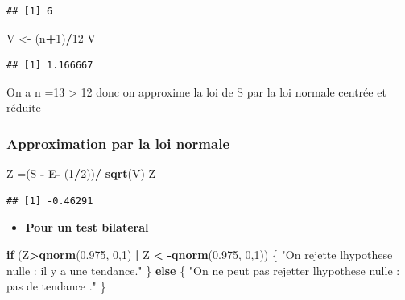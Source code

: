 \documentclass[
  12pt,
]{article}
\newenvironment{Shaded}{\begin{snugshade}}{\end{snugshade}}
\newcommand{\ControlFlowTok}[1]{\textcolor[rgb]{0.13,0.29,0.53}{\textbf{#1}}}
\newcommand{\DecValTok}[1]{\textcolor[rgb]{0.00,0.00,0.81}{#1}}
\newcommand{\FloatTok}[1]{\textcolor[rgb]{0.00,0.00,0.81}{#1}}
\newcommand{\FunctionTok}[1]{\textcolor[rgb]{0.13,0.29,0.53}{\textbf{#1}}}
\newcommand{\NormalTok}[1]{#1}
\newcommand{\OtherTok}[1]{\textcolor[rgb]{0.56,0.35,0.01}{#1}}
\newcommand{\SpecialCharTok}[1]{\textcolor[rgb]{0.81,0.36,0.00}{\textbf{#1}}}
\newcommand{\StringTok}[1]{\textcolor[rgb]{0.31,0.60,0.02}{#1}}
\providecommand{\tightlist}{%
  \setlength{\itemsep}{0pt}\setlength{\parskip}{0pt}}
\begin{document}
\begin{verbatim}
## [1] 6
\end{verbatim}

\begin{Shaded}
\begin{Highlighting}[]
\NormalTok{V }\OtherTok{\textless{}{-}}\NormalTok{ (n}\SpecialCharTok{+}\DecValTok{1}\NormalTok{)}\SpecialCharTok{/}\DecValTok{12}
\NormalTok{V}
\end{Highlighting}
\end{Shaded}

\begin{verbatim}
## [1] 1.166667
\end{verbatim}

On a n =13 \textgreater{} 12 donc on approxime la loi de S par la loi
normale centrée et réduite

\subsubsection{Approximation par la loi
normale}\label{approximation-par-la-loi-normale}

\begin{Shaded}
\begin{Highlighting}[]
\NormalTok{Z }\OtherTok{=}\NormalTok{(S }\SpecialCharTok{{-}}\NormalTok{ E}\SpecialCharTok{{-}}\NormalTok{ (}\DecValTok{1}\SpecialCharTok{/}\DecValTok{2}\NormalTok{))}\SpecialCharTok{/} \FunctionTok{sqrt}\NormalTok{(V)}
\NormalTok{Z}
\end{Highlighting}
\end{Shaded}

\begin{verbatim}
## [1] -0.46291
\end{verbatim}

\begin{itemize}
\tightlist
\item
  \textbf{Pour un test bilateral}
\end{itemize}

\begin{Shaded}
\begin{Highlighting}[]
\ControlFlowTok{if}\NormalTok{ (Z}\SpecialCharTok{\textgreater{}}\FunctionTok{qnorm}\NormalTok{(}\FloatTok{0.975}\NormalTok{, }\DecValTok{0}\NormalTok{,}\DecValTok{1}\NormalTok{) }\SpecialCharTok{|}\NormalTok{ Z }\SpecialCharTok{\textless{}} \SpecialCharTok{{-}}\FunctionTok{qnorm}\NormalTok{(}\FloatTok{0.975}\NormalTok{, }\DecValTok{0}\NormalTok{,}\DecValTok{1}\NormalTok{)) \{}
\StringTok{"On rejette l\textquotesingle{}hypothese nulle : il y a une tendance."}
\NormalTok{\} }\ControlFlowTok{else}\NormalTok{ \{}
\StringTok{"On ne peut pas rejetter l\textquotesingle{}hypothese nulle : pas de tendance ."}
\NormalTok{\}}
\end{Highlighting}
\end{Shaded}
\end{document}
